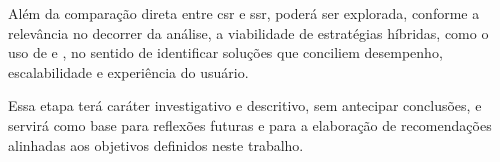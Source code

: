 Além da comparação direta entre {\acrshort{csr}} e {\acrshort{ssr}}, poderá ser explorada, conforme a relevância no decorrer da análise, a viabilidade de estratégias híbridas, como o uso de  e , no sentido de identificar soluções que conciliem desempenho, escalabilidade e experiência do usuário.

Essa etapa terá caráter investigativo e descritivo, sem antecipar conclusões, e servirá como base para reflexões futuras e para a elaboração de recomendações alinhadas aos objetivos definidos neste trabalho.
